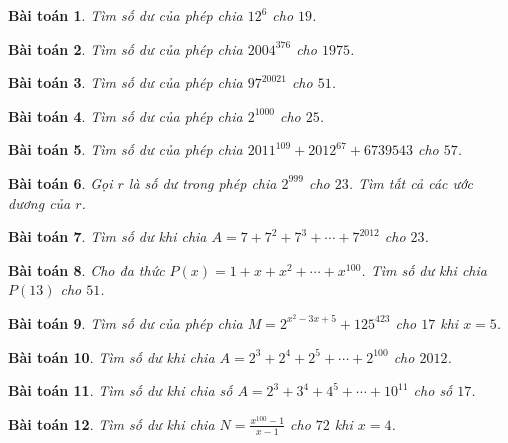 \documentclass{article}
\newtheorem{baitoan}{Bài toán}
\begin{document}
\begin{baitoan}
	Tìm số dư của phép chia $12^6$ cho $19$.
\end{baitoan}

\begin{baitoan}
	Tìm số dư của phép chia $2004^{376}$ cho $1975$.
\end{baitoan}

\begin{baitoan}
	Tìm số dư của phép chia $97^{20021}$ cho $51$.
\end{baitoan}

\begin{baitoan}
	Tìm số dư của phép chia $2^{1000}$ cho $25$.
\end{baitoan}

\begin{baitoan}
	Tìm số dư của phép chia $2011^{109} + 2012^{67} + 6739543$ cho $57$.
\end{baitoan}

\begin{baitoan}
	Gọi $r$ là số dư trong phép chia $2^{999}$ cho $23$. Tìm tất cả các ước dương của $r$.
\end{baitoan}

\begin{baitoan}
	Tìm số dư khi chia $A = 7 + 7^2 + 7^3 + \cdots + 7^{2012}$ cho $23$.
\end{baitoan}

\begin{baitoan}
	Cho đa thức $P(x) = 1 + x + x^2 + \cdots + x^{100}$. Tìm số dư khi chia $P(13)$ cho $51$.
\end{baitoan}

\begin{baitoan}
	Tìm số dư của phép chia $M = 2^{x^2 - 3x + 5} + 125^{423}$ cho $17$ khi $x = 5$.
\end{baitoan}

\begin{baitoan}
	Tìm số dư khi chia $A = 2^3 + 2^4 + 2^5 + \cdots + 2^{100}$ cho $2012$.
\end{baitoan}

\begin{baitoan}
	Tìm số dư khi chia số $A = 2^3 + 3^4 + 4^5 + \cdots + 10^{11}$ cho số $17$.
\end{baitoan}

\begin{baitoan}
	Tìm số dư khi chia $N = \frac{x^{100} - 1}{x - 1}$ cho $72$ khi $x = 4$.
\end{baitoan}
\end{document}
